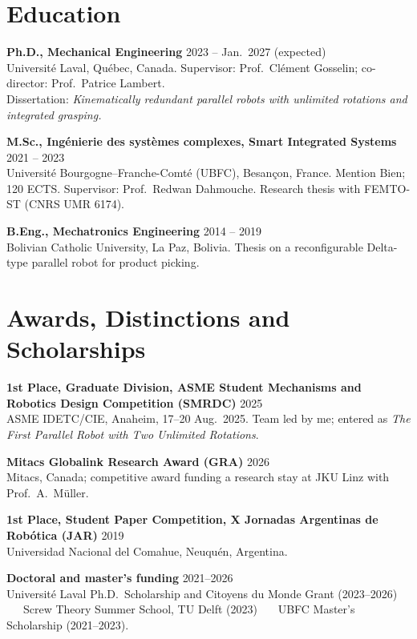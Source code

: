 \documentclass[11pt,letterpaper]{article}
\newenvironment{items}{\begin{list}{}{%
  \setlength{\leftmargin}{1.4em}\setlength{\itemindent}{-0.4em}
  \setlength{\itemsep}{0.5pt}\setlength{\parsep}{0pt}\setlength{\topsep}{1pt}}}%
  {\end{list}}
\newcommand{\dateline}[1]{\hfill{\footnotesize\color{cap} #1}}
\begin{document}
\section{Education}
\begin{items}
\item[] \textbf{Ph.D., Mechanical Engineering} \dateline{2023 -- Jan.~2027 (expected)}\\
{\footnotesize Universit\'e Laval, Qu\'ebec, Canada. Supervisor: Prof.~Cl\'ement Gosselin; co-director: Prof.~Patrice Lambert.\\
Dissertation: \emph{Kinematically redundant parallel robots with unlimited rotations and integrated grasping.}}
\item[] \textbf{M.Sc., Ing\'enierie des syst\`emes complexes, Smart Integrated Systems} \dateline{2021 -- 2023}\\
{\footnotesize Universit\'e Bourgogne--Franche-Comt\'e (UBFC), Besan\c{c}on, France. Mention Bien; 120 ECTS.
Supervisor: Prof.~Redwan Dahmouche. Research thesis with FEMTO-ST (CNRS UMR 6174).}

\item[] \textbf{B.Eng., Mechatronics Engineering} \dateline{2014 -- 2019}\\
{\footnotesize Bolivian Catholic University, La Paz, Bolivia. Thesis on a reconfigurable Delta-type parallel robot for product picking.}
\end{items}

\section{Awards, Distinctions and Scholarships}
\begin{items}
\item[] \textbf{1st Place, Graduate Division, ASME Student Mechanisms and Robotics Design Competition (SMRDC)} \dateline{2025}\\
{\footnotesize ASME IDETC/CIE, Anaheim, 17--20 Aug.~2025. Team led by me; entered as \emph{The First Parallel Robot with Two Unlimited Rotations}.}
\item[] \textbf{Mitacs Globalink Research Award (GRA)} \dateline{2026}\\
{\footnotesize Mitacs, Canada; competitive award funding a research stay at JKU Linz with Prof.~A.~M\"uller.}
\item[] \textbf{1st Place, Student Paper Competition, X Jornadas Argentinas de Rob\'otica (JAR)} \dateline{2019}\\
{\footnotesize Universidad Nacional del Comahue, Neuqu\'en, Argentina.}
\item[] \textbf{Doctoral and master's funding} \dateline{2021--2026}\\
{\footnotesize Universit\'e Laval Ph.D.\ Scholarship and Citoyens du Monde Grant (2023--2026) \ \textbullet\ \ Screw Theory Summer School, TU Delft (2023) \ \textbullet\ \ UBFC Master's Scholarship (2021--2023).}
\end{items}
\end{document}
